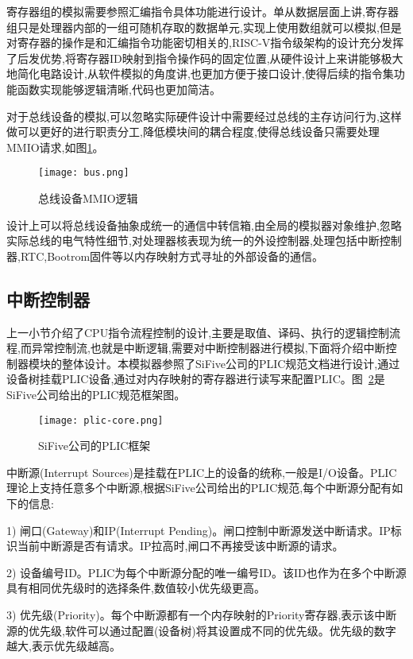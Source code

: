 寄存器组的模拟需要参照汇编指令具体功能进行设计。单从数据层面上讲,寄存器组只是处理器内部的一组可随机存取的数据单元,实现上使用数组就可以模拟,但是对寄存器的操作是和汇编指令功能密切相关的,RISC-V指令级架构的设计充分发挥了后发优势,将寄存器ID映射到指令操作码的固定位置,从硬件设计上来讲能够极大地简化电路设计,从软件模拟的角度讲,也更加方便于接口设计,使得后续的指令集功能函数实现能够逻辑清晰,代码也更加简洁。


对于总线设备的模拟,可以忽略实际硬件设计中需要经过总线的主存访问行为,这样做可以更好的进行职责分工,降低模块间的耦合程度,使得总线设备只需要处理MMIO请求,如图\ref{fig:bus}。
\begin{figure}[H]
  \centering
  \texttt{[image: bus.png]}
  \caption{总线设备MMIO逻辑}
  \label{fig:bus}
\end{figure}


设计上可以将总线设备抽象成统一的通信中转信箱,由全局的模拟器对象维护,忽略实际总线的电气特性细节,对处理器核表现为统一的外设控制器,处理包括中断控制器,RTC,Bootrom固件等以内存映射方式寻址的外部设备的通信。

\clearpage
\subsection{中断控制器}
上一小节介绍了CPU指令流程控制的设计,主要是取值、译码、执行的逻辑控制流程,而异常控制流,也就是中断逻辑,需要对中断控制器进行模拟,下面将介绍中断控制器模块的整体设计。本模拟器参照了SiFive公司的PLIC规范文档进行设计,通过设备树挂载PLIC设备,通过对内存映射的寄存器进行读写来配置PLIC。图~\ref{fig:plic-core}是SiFive公司给出的PLIC规范框架图。
\begin{figure}[H]
    \centering
    \texttt{[image: plic-core.png]}
    \caption{SiFive公司的PLIC框架}
    \label{fig:plic-core}
\end{figure}


中断源(Interrupt Sources)是挂载在PLIC上的设备的统称,一般是I/O设备。PLIC理论上支持任意多个中断源,根据SiFive公司给出的PLIC规范,每个中断源分配有如下的信息:


1) 闸口(Gateway)和IP(Interrupt Pending)。闸口控制中断源发送中断请求。IP标识当前中断源是否有请求。IP拉高时,闸口不再接受该中断源的请求。


2) 设备编号ID。PLIC为每个中断源分配的唯一编号ID。该ID也作为在多个中断源具有相同优先级时的选择条件,数值较小优先级更高。


3) 优先级(Priority)。每个中断源都有一个内存映射的Priority寄存器,表示该中断源的优先级,软件可以通过配置(设备树)将其设置成不同的优先级。优先级的数字越大,表示优先级越高。


